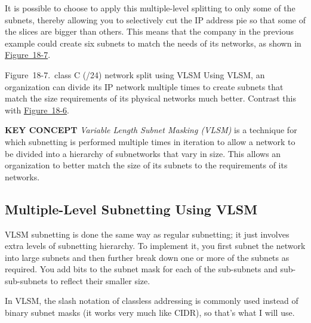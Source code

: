 \documentclass[b5paper,11pt]{memoir}
\begin{document}
It is possible to choose to apply this multiple-level splitting to only
some of the subnets, thereby allowing you to selectively cut the IP
address pie so that some of the slices are bigger than others. This
means that the company in the previous example could create six subnets
to match the needs of its networks, as shown in
\protect\hyperlink{ch18s08.htmlux5cux23class_c_24_network_split_using_vlsm_usin}{Figure~18-7}.

\protect\hypertarget{ch18s08.htmlux5cux23class_c_24_network_split_using_vlsm_usin}{}{}

\protect\hypertarget{ch18s08.htmlux5cux23I_mediaobject4_d1e20449}{}{}

Figure~18-7.~class C (/24) network split using VLSM Using VLSM, an
organization can divide its IP network multiple times to create subnets
that match the size requirements of its physical networks much better.
Contrast this with
\protect\hyperlink{ch18s08.htmlux5cux23class_c_24_network_split_into_eight_conv}{Figure~18-6}.


\protect\hypertarget{ch18s08.htmlux5cux23idx-CHP-18-0744}{}{}{\textbf{KEY
CONCEPT}} {\emph{Variable Length Subnet Masking (VLSM)}} is a technique
for which subnetting is performed multiple times in iteration to allow a
network to be divided into a hierarchy of subnetworks that vary in size.
This allows an organization to better match the size of its subnets to
the requirements of its networks.

\subsection[Multiple-Level Subnetting Using
VLSM]{\texorpdfstring{\protect\hypertarget{ch18s08.htmlux5cux23multiple-level_subnetting_using_vlsm}{}{}Multiple-Level
Subnetting Using VLSM}{Multiple-Level Subnetting Using VLSM}}

VLSM subnetting is done the same way as regular subnetting; it just
involves extra levels of subnetting hierarchy. To implement it, you
first subnet the network into large subnets and then further break down
one or more of the subnets as required. You add bits to the subnet mask
for each of the sub-subnets and sub-sub-subnets to reflect their smaller
size.

In VLSM, the slash notation of classless addressing is commonly used
instead of binary subnet masks (it works very much like CIDR), so that's
what I will use.
\end{document}
